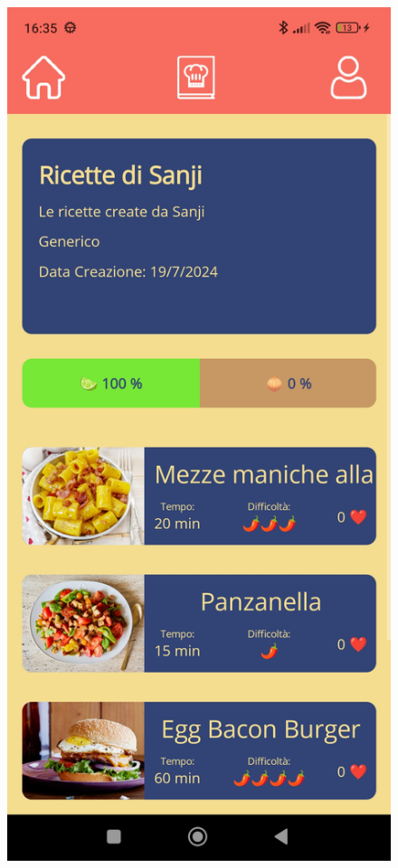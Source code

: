﻿\documentclass[a4paper,12pt]{report}
\begin{document}
\begin{figure}[h!]
    \begin{minipage}{.5\textwidth}
        \centering
        \includegraphics[width=0.9\linewidth]{app_images/CollectionPage.jpg}
    \end{minipage}

\end{figure}
\end{document}
